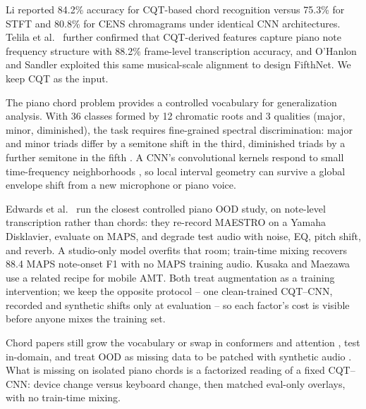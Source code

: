 \documentclass[pdflatex,sn-mathphys-num,iicol]{sn-jnl}
\theoremstyle{thmstyleone}
\theoremstyle{thmstyletwo}
\theoremstyle{thmstylethree}
\begin{document}
Li \cite{Li2021} reported 84.2\% accuracy for CQT-based chord recognition versus 75.3\% for STFT and 80.8\% for CENS chromagrams under identical CNN architectures. Telila et al.\ \cite{Telila2023} further confirmed that CQT-derived features capture piano note frequency structure with 88.2\% frame-level transcription accuracy, and O'Hanlon and Sandler \cite{OHanlon2021} exploited this same musical-scale alignment to design FifthNet. We keep CQT as the input.

The piano chord problem provides a controlled vocabulary for generalization analysis. With 36 classes formed by 12 chromatic roots and 3 qualities (major, minor, diminished), the task requires fine-grained spectral discrimination: major and minor triads differ by a semitone shift in the third, diminished triads by a further semitone in the fifth \cite{Harte2010}. A CNN's convolutional kernels respond to small time-frequency neighborhoods \cite{OShea2015}\cite{Purwono2022}, so local interval geometry can survive a global envelope shift from a new microphone or piano voice.

Edwards et al.\ \cite{Edwards2024} run the closest controlled piano OOD study, on note-level transcription rather than chords: they re-record MAESTRO on a Yamaha Disklavier, evaluate on MAPS, and degrade test audio with noise, EQ, pitch shift, and reverb. A studio-only model overfits that room; train-time mixing recovers 88.4 MAPS note-onset F1 with no MAPS training audio. Kusaka and Maezawa \cite{Kusaka2024} use a related recipe for mobile AMT. Both treat augmentation as a training intervention; we keep the opposite protocol -- one clean-trained CQT--CNN, recorded and synthetic shifts only at evaluation -- so each factor's cost is visible before anyone mixes the training set.

Chord papers still grow the vocabulary \cite{Majchrzak2025} or swap in conformers \cite{Akram2025} and attention \cite{Kusaka2024}, test in-domain, and treat OOD as missing data to be patched with synthetic audio \cite{Byambatsogt2020}\cite{Ostermann2023}. What is missing on isolated piano chords is a factorized reading of a fixed CQT--CNN: device change versus keyboard change, then matched eval-only overlays, with no train-time mixing.
\end{document}
